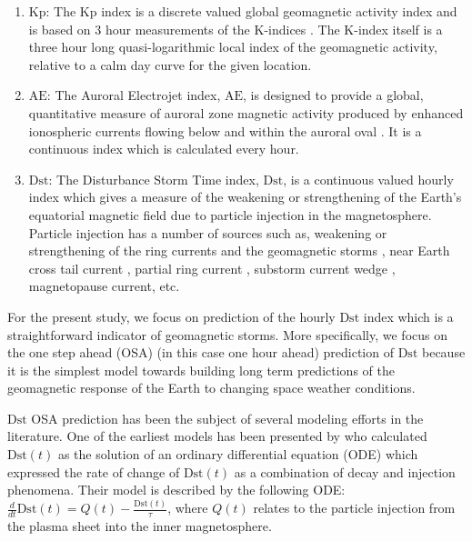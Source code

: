 \begin{enumerate}
    \item $\mathrm{Kp}$: The Kp index is a discrete valued global geomagnetic activity index and is 
    based on 3 hour measurements of the K-indices \citep{Bartels}. The K-index itself is a three 
    hour long quasi-logarithmic local index of the geomagnetic activity, relative to a calm day 
    curve for the given location.
    
    \item $\mathrm{AE}$: The Auroral Electrojet index, $\mathrm{AE}$, is designed to provide a 
    global, quantitative measure of auroral zone magnetic activity produced by enhanced ionospheric 
    currents flowing below and within the auroral oval \citep{AEIndex}. It is a continuous index 
    which is calculated every hour.
    
    \item $\mathrm{Dst}$: The Disturbance Storm Time index, $\mathrm{Dst}$, is a continuous valued 
    hourly index which gives a measure of the weakening or strengthening of the Earth's equatorial 
    magnetic field due to particle injection in the magnetosphere. Particle injection has a number 
    of sources such as, weakening or strengthening of the ring currents and the geomagnetic storms 
    \citep{DesslerAndParker}, near Earth cross tail current 
    \citep{ganushkina2004long,angeo-28-123-2010}, partial ring current \citep{JGRA:JGRA15878}, 
    substorm current wedge \citep{JGRA:JGRA15211}, magnetopause current, etc. 
\end{enumerate}

For the present study, we focus on prediction of the hourly $\mathrm{Dst}$ index which is a 
straightforward indicator of geomagnetic storms. More specifically, we focus on the 
one step ahead (OSA) (in this case one hour ahead) prediction of $\mathrm{Dst}$ because it 
is the simplest model towards building long term predictions of the geomagnetic response of the 
Earth to changing space weather conditions. 

$\mathrm{Dst}$ OSA prediction has been the subject of several modeling efforts in the 
literature. One of the earliest models has been presented by \citet{JGR:JGR10260} who calculated 
$\mathrm{Dst}(t)$ as the solution of an ordinary differential equation (ODE) which expressed 
the rate of change of $\mathrm{Dst}(t)$ as a combination of decay and injection phenomena. Their 
model is described by the following ODE: 
$\frac{d}{dt} \mathrm{Dst}(t) = Q(t) - \frac{\mathrm{Dst}(t)}{\tau}$, where $Q(t)$ relates to the 
particle injection from the plasma sheet into the inner magnetosphere. 

